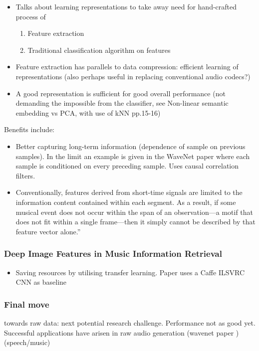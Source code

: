 \documentclass[12pt]{llncs}
\begin{document}
\begin{itemize}
	\item Talks about learning representations to take away need for hand-crafted process of 

\begin{enumerate} 
	\item Feature extraction
	\item Traditional classification algorithm on features
\end{enumerate}
	\item Feature extraction has parallels to data compression: efficient learning of representations (also perhaps useful in replacing conventional audio codecs?)
	\item A good representation is sufficient for good overall performance (not demanding the impossible from the classifier, see Non-linear semantic embedding vs PCA, with use of kNN pp.15-16)
\end{itemize}
Benefits include:
\begin{itemize}
	\item Better capturing long-term information (dependence of sample on previous samples). In the limit an example is given in the WaveNet paper \cite{van2016wavenet} where each sample is conditioned on every preceding sample. Uses causal correlation filters. 

	\item Conventionally, features derived from short-time signals are limited to the information content contained within each segment. As a result, if some musical event does not occur within the span of an observation---a motif that does not fit within a single frame---then it simply cannot be described by that feature vector alone.”





\end{itemize}


\subsubsection*{Deep Image Features in Music Information Retrieval \cite{gwardys2014deep}}
\begin{itemize}
	\item Saving resources by utilising transfer learning. Paper uses a Caffe ILSVRC CNN as baseline 
\end{itemize}


\subsubsection{Final move}
towards raw data: next potential research challenge. Performance not as good yet. Successful applications have arisen in raw audio generation (wavenet paper \cite{van2016wavenet}) (speech/music)
\end{document}
